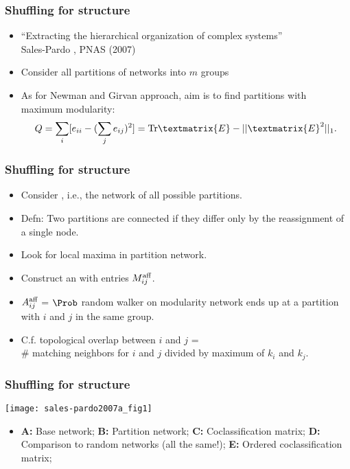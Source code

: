 \begin{frame}
  \frametitle{Shuffling for structure}

  \begin{itemize}
  \item<1-> 
    ``Extracting the hierarchical organization 
    of complex systems''\\
    Sales-Pardo \etal, PNAS (2007)\cite{sales-pardo2007a,sales-pardo2007b}
  \item<2->
    Consider all partitions of networks into $m$ groups
  \item<3->    
    As for Newman and Girvan approach, aim is to find
    partitions with maximum modularity:
    $$
    Q = 
    \sum_{i}
    [e_{ii} - (\sum_j e_{ij})^2]
    =
    {\textnormal{Tr}} \textmatrix{E} - || \textmatrix{E}^2 ||_1.
    $$
    \end{itemize}
\end{frame}

\begin{frame}
  \frametitle{Shuffling for structure}

  \begin{itemize}
  \item<1->
    Consider , i.e., 
    the network of all possible partitions.
  \item<2->
    \alert{Defn:} Two partitions are connected if
    they differ only by the 
    reassignment of a single node.
  \item<3->
    Look for local maxima in partition network.
  \item<4->
    Construct an  with entries $M_{ij}^{\textnormal{aff}}$.
  \item<5->
    $A_{ij}^{\textnormal{aff}}$ = $\Prob$ random walker on modularity network
    ends up at a partition with $i$ and $j$ in the same group.
  \item<5->
    C.f. \alert{topological overlap} between $i$ and $j$ = \\
    \# matching neighbors for $i$ and $j$ divided by 
    maximum of $k_i$ and $k_j$.
  \end{itemize}

\end{frame}

\begin{frame}
  \frametitle{Shuffling for structure}

  \texttt{[image: sales-pardo2007a\_fig1]}

  \begin{itemize}
  \item 
    \textbf{A:} 
    Base network;
    \textbf{B:} 
    Partition network;
    \textbf{C:} 
    Coclassification matrix;
    \textbf{D:} 
    Comparison to random networks (all the same!);
    \textbf{E:} 
    Ordered coclassification matrix;
  \end{itemize}

\end{frame}

